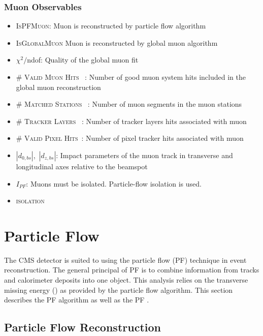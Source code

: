 \subsubsection{Muon Observables}
\begin{itemize}
    \item \textsc{IsPFMuon}: Muon is reconstructed by particle flow algorithm
    \item \textsc{IsGlobalMuon} Muon is reconstructed by global muon algorithm
    \item $\chi^2/$ndof: Quality of the global muon fit
    \item \textsc{\# Valid Muon Hits} ~: Number of good muon system hits included in the global muon reconstruction
    \item \textsc{\# Matched Stations} ~: Number of muon segments in the muon stations
    \item \textsc{\# Tracker Layers} ~: Number of tracker layers hits associated with muon
    \item \textsc{\# Valid Pixel Hits}~: Number of pixel tracker hits associated with muon
    \item $|d_{0,bs}|$,~$|d_{z,bs}|$: Impact parameters of the muon track in transverse and longitudinal axes relative to the beamspot
    \item $I_{PF}$: Muons must be isolated. Particle-flow isolation is used. 
    \item \textsc{isolation}
\end{itemize}



\section{Particle Flow}
The CMS detector is suited to using the particle flow (PF) technique in event reconstruction. The general principal of PF is to combine information from tracks and calorimeter deposits into one object. This analysis relies on the transverse missing energy (\met) as provided by the particle flow algorithm. This section describes the PF algorithm as well as the PF \met. 

\subsection{Particle Flow Reconstruction}
